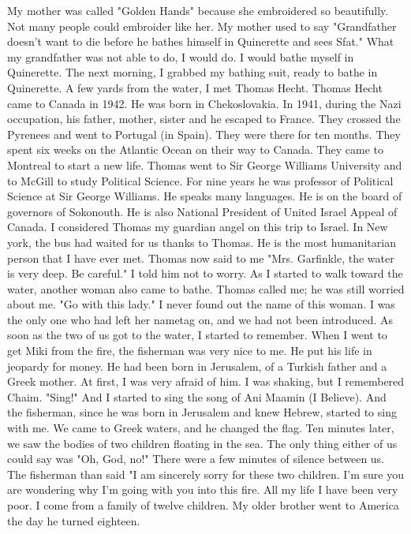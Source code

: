 My mother 
was called "Golden Hands" because she embroidered so beautifully.
Not 
many people could embroider like her.
My mother used to say "Grandfather 
doesn't want to die before he bathes himself in Quinerette and sees Sfat."
What my grandfather was not able to do, I would do.
I would bathe myself in Quinerette.
The next morning, I grabbed my bathing suit, ready to bathe in Quinerette.
A few yards from the water, I met Thomas Hecht.
Thomas Hecht came to Canada in 1942.
He was born in Chekoslovakia.
In 1941, during the Nazi occupation, his father, mother, sister and he escaped to France.
They crossed the Pyrenees and went to Portugal (in Spain).
They were 
there for ten months.
They spent six weeks on the Atlantic Ocean on their way to Canada.
They came to Montreal to start a new life.
Thomas went to Sir George Williams University and to McGill to study Political Science.
For nine years he was professor of Political Science at Sir George Williams.
He speaks many languages.
He is on the board of governors of Sokonouth.
He is also National President of United Israel Appeal of Canada.
I considered Thomas my guardian angel on this trip to Israel.
In 
New york, the bus had waited for us thanks to Thomas.
He is the most 
humanitarian person that I have ever met.
Thomas now said to me "Mrs.
Garfinkle, the water is very deep.
Be 
careful."
I told him not to worry.
As I started to walk toward the water, 
another woman also came to bathe.
Thomas called me; he was still worried 
about me.
"Go with this lady."
I never found out the name of this woman.
I was the only one who had left her nametag on, and we had not been introduced.
As soon as the two of us got to the water, I started to remember.
When I went to get Miki from the fire, the fisherman was very nice 
to me.
He put his life in jeopardy for money.
He had been born in Jerusalem, of a Turkish father and a Greek mother.
At first, I was very afraid of him.
I was shaking, but I remembered Chaim.
"Sing!"
And I started to sing the song of Ani Maamin (I Believe).
And the fisherman, since he was born in Jerusalem and knew Hebrew, started to sing with me.
We 
came to Greek waters, and he changed the flag.
Ten minutes later, we
saw the bodies of two children floating in the sea.
The only thing either 
of us could say was "Oh, God, no!"
There were a few minutes of silence
between us.
The fisherman than said "I am sincerely sorry for these two 
children.
I'm sure you are wondering why I'm going with you into this 
fire.
All my life I have been very poor.
I come from a family of twelve 
children.
My older brother went to America the day he turned eighteen.

